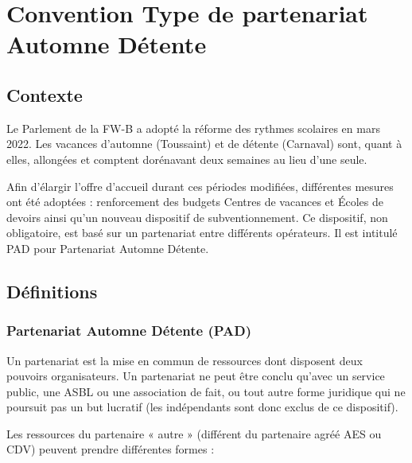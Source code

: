\chapter{Convention Type de partenariat Automne Détente}

\section{Contexte}
Le Parlement de la FW-B a adopté la réforme des rythmes scolaires en mars 2022. Les vacances d’automne (Toussaint) et de détente (Carnaval) sont, quant à elles, allongées et comptent dorénavant deux semaines au lieu d’une seule.

Afin d’élargir l’offre d’accueil durant ces périodes modifiées, différentes mesures ont été adoptées : renforcement des budgets Centres de vacances et Écoles de devoirs ainsi qu’un nouveau dispositif de subventionnement. Ce dispositif, non obligatoire, est basé sur un partenariat entre différents opérateurs. Il est intitulé PAD pour Partenariat Automne Détente. 

\section{Définitions}

\subsection{Partenariat Automne Détente (PAD)}
Un partenariat est la mise en commun de ressources dont disposent deux pouvoirs
organisateurs. Un partenariat ne peut être conclu qu’avec un service public, une ASBL ou une association de fait, ou tout autre forme juridique qui ne poursuit pas un but lucratif (les indépendants sont donc exclus de ce dispositif). 

Les ressources du partenaire « autre » (différent du partenaire agréé AES ou CDV) peuvent prendre différentes formes : 

